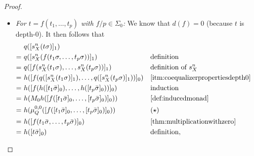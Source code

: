 \documentclass[a4paper,UKenglish,cleveref,thm-restate,numberwithinsect,final]{lipics-v2021}
\newcommand{\sigp}{\Sigma_0}
\theoremstyle{plain}
\newcommand{\id}{\mathit{id}}
\numberwithin{equation}{section}
\newcommand{\+}[1]{\mathcal{#1}\xspace}
\theoremstyle{definition}
\begin{document}
\begin{proof}
\begin{enumerate}[wide]
\begin{itemize}
                    \textit{For \(t = x\) with \(x \in Y\):}
                    \begin{align*}
                        &q([s^n_X(t\sigma)]_1) \\
                        =~&q(\llbracket [s^n_X(t\sigma)]_1 \rrbracket^\id_0) && \text{definition} \\
                        =~&q(\mu^{0, 1}_{M_n X}([[s^n_X(t\sigma)]_1]_0)) && \text{\cref{def:inducedmonad}} \\
                        =~&h(M_0 q([[s^n_X(t\sigma)]_1]_0)) && \text{\cref{eq:m0algebramorphism}} \\
                        =~&h([q([s^n_X(\sigma(x))]_1)]_0) && \text{\cref{def:inducedmonad}} \\
                        =~&h([\bar{\sigma}(x)]_0) && \text{definition of } \bar{\sigma} \\
                        =~&h([t\bar{\sigma}]_0) && \text{definition}.
                    \end{align*}
                \item
                    \textit{For \(t = f(t_1, \ldots, t_p)\) with \(f/p \in \sigp\):}
                    We know that \(d(f) = 0\) (because \(t\) is depth-0). It then follows that
                    \begin{align*}
                        &q([s^n_X(t\sigma)]_1) \\
                        =~&q([s^n_X(f(t_1\sigma, \ldots, t_p\sigma))]_1) && \text{definition} \\
                        =~&q([f(s^n_X(t_1\sigma), \ldots, s^n_X(t_p\sigma))]_1) && \text{definition of } s^n_X \\
                        =~&h([f(q([s^n_X(t_1\sigma)]_1), \ldots, q([s^n_X(t_p\sigma)]_1))]_0) && \text{\eqref{itm:coequalizerpropertiesdepth0}} \\
                        =~&h([f(h([t_1\bar{\sigma}]_0), \ldots, h([t_p\bar{\sigma}]_0))]_0) && \text{induction} \\
                        =~&h(M_0 h([f([t_1\bar{\sigma}]_0, \ldots, [t_p\bar{\sigma}]_0)]_0)) && \text{\cref{def:inducedmonad}} \\
                        =~&h(\mu^{0, 0}_{Q}([f([t_1\bar{\sigma}]_0, \ldots, [t_p\bar{\sigma}]_0)]_0)) && (\star) \\
                        =~&h([f(t_1\bar{\sigma}, \ldots, t_p\bar{\sigma})]_0) && \text{\cref{thm:multiplicationwithzero}} \\
                        =~&h([t\bar{\sigma}]_0) && \text{definition},

\end{align*}
\end{itemize}
\end{enumerate}
\end{proof}
\end{document}

